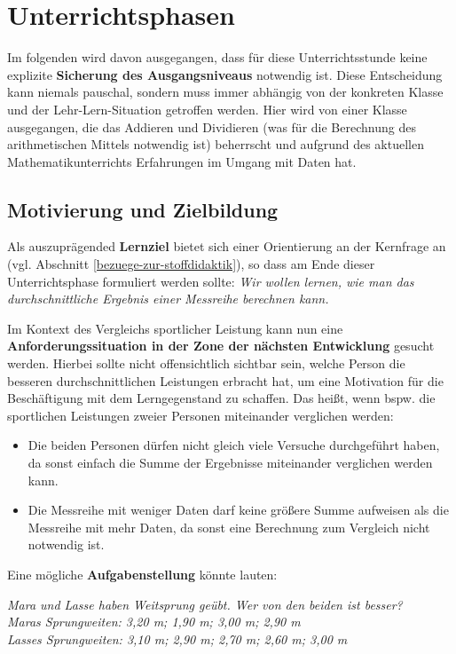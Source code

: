 \documentclass[
]{scrbook}
\providecommand{\tightlist}{%
  \setlength{\itemsep}{0pt}\setlength{\parskip}{0pt}}
\theoremstyle{definition}
\theoremstyle{definition}
\theoremstyle{definition}
\theoremstyle{definition}
\theoremstyle{remark}
\begin{document}
\section{Unterrichtsphasen}\label{unterrichtsphasen}

Im folgenden wird davon ausgegangen, dass für diese Unterrichtsstunde keine explizite \textbf{Sicherung des Ausgangsniveaus} notwendig ist. Diese Entscheidung kann niemals pauschal, sondern muss immer abhängig von der konkreten Klasse und der Lehr-Lern-Situation getroffen werden. Hier wird von einer Klasse ausgegangen, die das Addieren und Dividieren (was für die Berechnung des arithmetischen Mittels notwendig ist) beherrscht und aufgrund des aktuellen Mathematikunterrichts Erfahrungen im Umgang mit Daten hat.

\subsection{Motivierung und Zielbildung}\label{motivierung-und-zielbildung-1}

Als auszuprägended \textbf{Lernziel} bietet sich einer Orientierung an der Kernfrage an (vgl. Abschnitt \ref{bezuege-zur-stoffdidaktik}), so dass am Ende dieser Unterrichtsphase formuliert werden sollte: \emph{Wir wollen lernen, wie man das durchschnittliche Ergebnis einer Messreihe berechnen kann.}

Im Kontext des Vergleichs sportlicher Leistung kann nun eine \textbf{Anforderungssituation in der Zone der nächsten Entwicklung} gesucht werden. Hierbei sollte nicht offensichtlich sichtbar sein, welche Person die besseren durchschnittlichen Leistungen erbracht hat, um eine Motivation für die Beschäftigung mit dem Lerngegenstand zu schaffen. Das heißt, wenn bspw. die sportlichen Leistungen zweier Personen miteinander verglichen werden:

\begin{itemize}
\tightlist
\item
  Die beiden Personen dürfen nicht gleich viele Versuche durchgeführt haben, da sonst einfach die Summe der Ergebnisse miteinander verglichen werden kann.
\item
  Die Messreihe mit weniger Daten darf keine größere Summe aufweisen als die Messreihe mit mehr Daten, da sonst eine Berechnung zum Vergleich nicht notwendig ist.
\end{itemize}

Eine mögliche \textbf{Aufgabenstellung} könnte lauten:

\emph{Mara und Lasse haben Weitsprung geübt. Wer von den beiden ist besser?}\\
\emph{Maras Sprungweiten: 3,20 m; 1,90 m; 3,00 m; 2,90 m}\\
\emph{Lasses Sprungweiten: 3,10 m; 2,90 m; 2,70 m; 2,60 m; 3,00 m}
\end{document}
